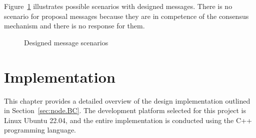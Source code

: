 Figure~\ref{figure:design.messages} illustrates possible scenarios with designed messages. There is no scenario for proposal messages because they are in competence of the consensus mechanism and there is no response for them.

\begin{figure}[h]
    \begin{center}
    \end{center}
    \caption{Designed message scenarios}
    \label{figure:design.messages}
\end{figure}



\chapter{Implementation}
\label{chap:impl}

This chapter provides a detailed overview of the design implementation outlined in Section~\ref{sec:node.BC}. The development platform selected for this project is Linux Ubuntu 22.04, and the entire implementation is conducted using the C++ programming language.

